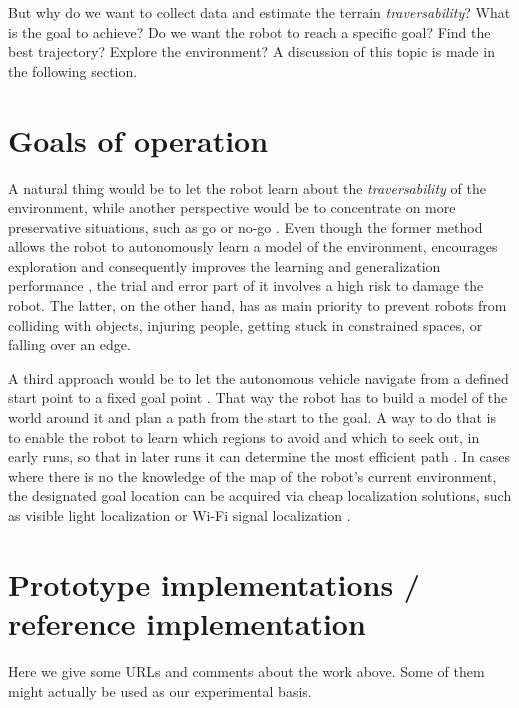 \documentclass[12pt,a4paper]{report}
\newcommand{\term}{\textit}
\newcommand{\acronym}{\MakeUppercase}
\begin{document}
	
	But why do we want to collect data and estimate the terrain \term{traversability}?
	What is the goal to achieve? Do we want the robot to reach a specific goal? Find 
	the best trajectory? Explore the environment? A discussion of this topic is made 
	in the following section.
	\\
	
	\section{Goals of operation}
	\label{sec:bg:goals}
	
	A natural thing would be to let the robot learn about the \term{traversability} 
	of the environment, while another perspective would be to concentrate on more 
	preservative situations, such as go or no-go \cite{Hirose}. Even though the 
	former method allows the robot to autonomously learn a model of the environment,
	encourages exploration and consequently improves the learning and generalization 
	performance \cite{Zhelo}, the trial and error part of it involves a high risk to 
	damage the robot. The latter, on the other hand, has as main priority to prevent 
	robots from colliding with objects, injuring people, getting stuck in constrained 
	spaces, or falling over an edge. 
	\par
	A third approach would be to let the autonomous vehicle navigate from a defined 
	start point to a fixed goal	point \cite{Shneier, Zhelo}. That way the robot has 
	to build a model of the world around it and plan a path from the start to the 
	goal. A way to do that is to enable the robot to learn which regions to avoid 
	and which to seek out, in early runs, so that in later runs it can determine the 
	most efficient path \cite{Shneier}. In cases where there is no the knowledge of 
	the map of the robot's current environment, the designated goal location can be 
	acquired via cheap localization solutions, such as visible light localization or 
	Wi-Fi signal localization \cite{Zhelo}.
	\\
	
	\section{Prototype implementations / reference implementation}
	\label{sec:bg:code}

	Here we give some \acronym{url}s and comments about the work above. Some of them 
	might actually be used as our experimental basis.
	\\
		
\end{document}
